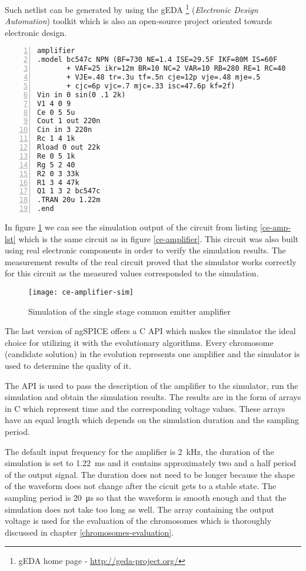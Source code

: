 Such netlist can be generated by using the gEDA \footnote{gEDA home page - \url{http://geda-project.org/}} (\textit{Electronic Design Automation}) toolkit which is also an open-source project oriented towards electronic design.

\begin{lstlisting}[caption={description of the common emitter amplifier using the SPICE syntax},
    label={ce-amp-lst},
    captionpos=b,
    numbers=left]
 amplifier
.model bc547c NPN (BF=730 NE=1.4 ISE=29.5F IKF=80M IS=60F
       + VAF=25 ikr=12m BR=10 NC=2 VAR=10 RB=280 RE=1 RC=40
       + VJE=.48 tr=.3u tf=.5n cje=12p vje=.48 mje=.5
       + cjc=6p vjc=.7 mjc=.33 isc=47.6p kf=2f)
Vin in 0 sin(0 .1 2k)
V1 4 0 9
Ce 0 5 5u
Cout 1 out 220n
Cin in 3 220n
Rc 1 4 1k
Rload 0 out 22k
Re 0 5 1k
Rg 5 2 40
R2 0 3 33k
R1 3 4 47k
Q1 1 3 2 bc547c
.TRAN 20u 1.22m
.end
\end{lstlisting}

In figure \ref{ce-amplifier-sim} we can see the simulation output of the circuit from listing \ref{ce-amp-lst} which is the same circuit as in figure \ref{ce-amplifier}. This circuit was also built using real electronic components in order to verify the simulation results. The measurement results of the real circuit proved that the simulator works correctly for this circuit as the measured values corresponded to the simulation.

\begin{figure}[!ht]
    \centering
    \texttt{[image: ce-amplifier-sim]}\label{ce-amplifier-sim}
    \caption{Simulation of the single stage common emitter amplifier}
\end{figure}

The last version of ngSPICE offers a C API which makes the simulator the ideal choice for utilizing it with the evolutionary algorithms. Every chromosome (candidate solution) in the evolution represents one amplifier and the simulator is used to determine the quality of it.

The API is used to pass the description of the amplifier to the simulator, run the simulation and obtain the simulation results. The results are in the form of arrays in C which represent time and the corresponding voltage values. These arrays have an equal length which depends on the simulation duration and the sampling period.

The default input frequency for the amplifier is \SI{2}{\kilo\hertz}, the duration of the simulation is set to \SI{1.22}{\milli\second} and it contains approximately two and a half period of the output signal. The duration does not need to be longer because the shape of the waveform does not change after the cicuit gets to a stable state. The sampling period is \SI{20}{\micro\second} so that the waveform is smooth enough and that the simulation does not take too long as well. The array containing the output voltage is used for the evaluation of the chromosomes which is thoroughly discussed in chapter \ref{chromosomes-evaluation}.

